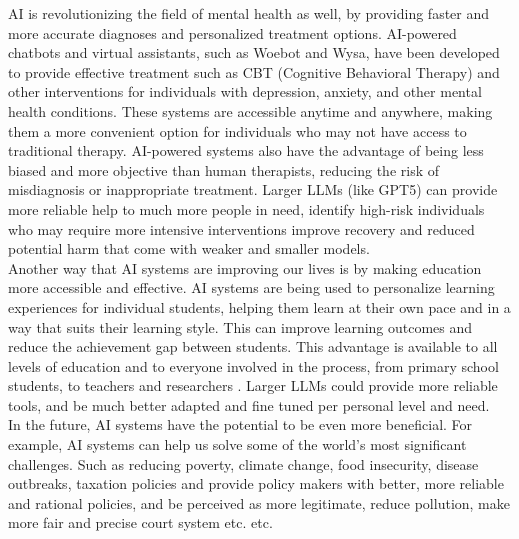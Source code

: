 \documentclass{article}
\begin{document}
AI is revolutionizing the field of mental health as well, by providing faster and more accurate diagnoses and personalized treatment options. AI-powered chatbots and virtual assistants, such as Woebot\cite{fitzpatrick2017delivering} and Wysa\cite{gupta2022delivery}, have been developed to provide effective treatment such as CBT (Cognitive Behavioral Therapy) and other interventions for individuals with depression, anxiety, and other mental health conditions. These systems are accessible anytime and anywhere, making them a more convenient option for individuals who may not have access to traditional therapy\cite{kjell-schwartz2023AI}. AI-powered systems also have the advantage of being less biased and more objective than human therapists, reducing the risk of misdiagnosis or inappropriate treatment\cite{fitzpatrick2017delivering}. Larger LLMs (like GPT5) can provide more reliable help to much more people in need, identify high-risk individuals who may require more intensive interventions improve recovery and reduced potential harm that come with weaker and smaller models.\\

Another way that AI systems are improving our lives is by making education more accessible and effective. AI systems are being used to personalize learning experiences for individual students, helping them learn at their own pace and in a way that suits their learning style. This can improve learning outcomes and reduce the achievement gap between students. This advantage is available to all levels of education and to everyone involved in the process, from primary school students, to teachers and researchers \cite{Kasneci2023ChatGPT}. Larger LLMs could provide more reliable tools, and be much better adapted and fine tuned per personal level and need.\\

In the future, AI systems have the potential to be even more beneficial. For example, AI systems can help us solve some of the world's most significant challenges. Such as reducing poverty\cite{ferreira2021using}, climate change\cite{cowls2023ai}, food insecurity\cite{chamara2020role}, disease outbreaks\cite{macintyre2022preventing}, taxation policies\cite{zheng2022ai} and provide policy makers with better, more reliable and rational policies, and be perceived as more legitimate\cite{starke2020AIpoliticaleu}, reduce pollution\cite{subramaniam2022artificial}, make more fair and precise court system\cite{sourdin2018judge} etc. etc. \\
\end{document}
